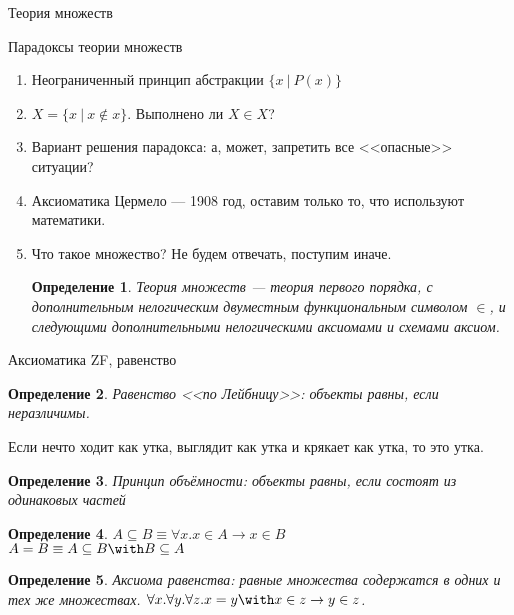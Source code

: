 \documentclass[aspectratio=169]{beamer}
\newtheorem{dfn}{Определение}[section]
\begin{document}
\newcommand\doubleplus{+\kern-1.3ex+\kern0.8ex}
\newcommand\mdoubleplus{\ensuremath{\mathbin{+\mkern-10mu+}}}

\begin{frame}{}
\LARGE\begin{center}Теория множеств\end{center}
\end{frame}

\begin{frame}{Парадоксы теории множеств}
\begin{enumerate}
\item Неограниченный принцип абстракции $\{ x\ |\ P(x)\}$ \pause
\item $X = \{ x\ |\ x \notin x \}$. Выполнено ли $X \in X$? \pause
\item Вариант решения парадокса: а, может, запретить все <<опасные>> ситуации? \pause
\item Аксиоматика Цермело --- 1908 год, оставим только то, что используют математики. \pause
\item Что такое множество? Не будем отвечать, поступим иначе.\pause

\begin{dfn} Теория множеств --- теория первого порядка,
с дополнительным нелогическим двуместным функциональным символом $\in$, и следующими 
дополнительными нелогическими аксиомами и схемами аксиом.
\end{dfn}
\end{enumerate}
\end{frame}

\begin{frame}{Аксиоматика ZF, равенство}
\begin{dfn} Равенство <<по Лейбницу>>: объекты равны, если неразличимы.\end{dfn} Если нечто ходит как утка, выглядит как 
утка и крякает как утка, то это утка.\pause
\begin{dfn} Принцип объёмности: объекты равны, если состоят из одинаковых частей\end{dfn}\pause

\begin{dfn} $A \subseteq B \equiv \forall x.x \in A \rightarrow x \in B$ \\\pause
 $A = B \equiv A \subseteq B \with B \subseteq A$ \end{dfn}\pause
\begin{dfn} Аксиома равенства: равные множества содержатся в одних и тех же множествах. 
$\forall x. \forall y. \forall z. x = y \with x \in z \rightarrow y \in z$.
\end{dfn}
\end{frame}
\end{document}
